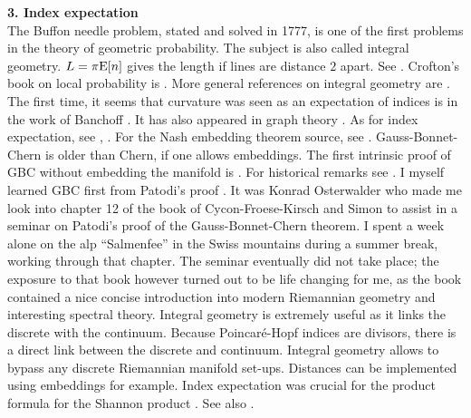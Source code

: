 \documentclass[12pt]{amsart}
\begin{document}
{\bf 3. Index expectation} \\

The Buffon needle problem, stated and solved in 1777, is one of the
first problems in the theory of geometric probability. The subject is also called integral geometry.
$L = \pi {\rm E}[n]$ gives the length if lines are distance $2$ apart. 
See \cite{Santalo1}.  Crofton's book on local probability is \cite{Crofton1968}.
More general references on integral geometry are \cite{Santalo,KlainRota,Schneider1,Blaschke,Nicoalescu}.
The first time, it seems that curvature was seen as an expectation of indices is in the work of Banchoff
\cite{Banchoff1967,Banchoff1970}.
It has also appeared in graph theory \cite{IntegralGeometryGraphs}.
As for index expectation, see \cite{indexexpectation} %
\cite{indexformula},     %
\cite{ConstantExpectationCurvature} 
\cite{DiscreteHopf}    %
\cite{DiscreteHopf2}.   %
For the Nash embedding theorem source, see \cite{EssentialNash}. Gauss-Bonnet-Chern is older than
Chern, if one allows embeddings.  The first intrinsic proof of GBC without embedding the manifold
is \cite{Chern44}. For historical remarks see \cite{chern1990}. I myself learned GBC first from 
Patodi's proof \cite{Cycon}.  It was Konrad Osterwalder who made me look into chapter 12 of the book of 
Cycon-Froese-Kirsch and Simon to assist in a seminar on Patodi’s proof of the Gauss-Bonnet-Chern theorem. 
I spent a week alone on the alp “Salmenfee” in the Swiss mountains during a summer break, working through 
that chapter. The seminar eventually did not take place; the exposure to that book however turned 
out to be life changing for me, as the book contained a nice concise introduction into modern Riemannian geometry
and interesting spectral theory. Integral geometry is extremely useful as it links the discrete with the continuum. 
Because Poincar\'e-Hopf indices are divisors, there is a direct link between the 
discrete and continuum. Integral geometry allows to bypass any discrete Riemannian
manifold set-ups. Distances can be implemented using embeddings for example. 
Index expectation was crucial for the product formula for the Shannon product
\cite{Shannon1956}. See also \cite{ComplexesGraphsProductsShannonCapacity}. \\
\end{document}
